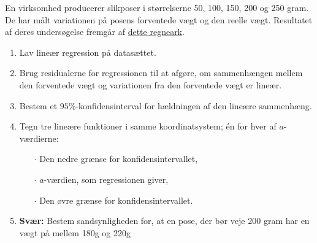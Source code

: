 En virksomhed producerer slikposer i størrelserne 50, 100, 150, 200 og 250 gram. De har målt variationen på posens forventede vægt og den reelle vægt. Resultatet af deres undersøgelse fremgår af \href{https://github.com/ChristianJLex/TeachingNotes/raw/master/2023-2024/Data og lign/VariationSlikpose.xlsx}{\color{blue!60} dette regneark}.


\begin{enumerate}[label = \roman*) ]
	\item Lav lineær regression på datasættet.
	\item Brug residualerne for regressionen til at afgøre, om sammenhængen mellem den forventede vægt og variationen 
	fra den forventede vægt er lineær.
	\item Bestem et $95\%$-konfidensinterval for hældningen af den lineære sammenhæng.
	\item Tegn tre lineære funktioner i samme koordinatsystem; én for hver af $a$-værdierne:
	\begin{itemize}
		\item[$\cdot$] Den nedre grænse for konfidensintervallet,
		\item[$\cdot$] $a$-værdien, som regressionen giver,
		\item[$\cdot$] Den øvre grænse for konfidensintervallet.
	\end{itemize}
	\item \textbf{Svær:} Bestem sandsynligheden for, at en pose, der bør veje 200 gram har en vægt på mellem 180g og
	 220g
\end{enumerate}
